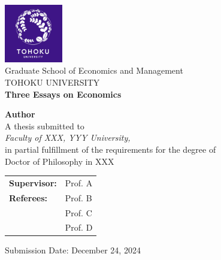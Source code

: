 \documentclass[oneside, 12pt, a4paper]{book}
\author{author}
\theoremstyle{definition}\newtheorem{definition}{Definition}
\theoremstyle{theorem}\newtheorem{corollary}{Corollary}
\theoremstyle{definition}\newtheorem{ass}{Assumption}
\theoremstyle{definition}\newtheorem{remark}{Remark}
\theoremstyle{theorem}\newtheorem{prop}{Proposition}
\theoremstyle{theorem}\newtheorem{lemma}{Lemma}
\theoremstyle{definition}\newtheorem{fact}{Fact}
\numberwithin{corollary}{chapter}
\numberwithin{prop}{chapter}
\numberwithin{ass}{chapter}
\numberwithin{definition}{chapter}
\numberwithin{lemma}{chapter}
\numberwithin{equation}{chapter}
\begin{document}

\begin{titlepage}
    \begin{center}
        \includegraphics[width=0.19\textwidth]{logo.png}\\[5pt]
        {Graduate School of Economics and Management}\\[5pt]
        {TOHOKU UNIVERSITY}\\[5pt]
        
        \vspace{1.5cm}
        {\huge\bfseries Three Essays on Economics}
        
        \vspace{1.5cm}
        {\Large\bfseries Author}\\[5pt]
        
        \vspace{2cm}
        {A thesis  submitted to} \\[5pt]
        \emph{{Faculty of XXX, YYY University,}}\\[5pt]
        {in partial fulfillment of the requirements for the degree of } \\[5pt]
        {Doctor of Philosophy in XXX} \\[5pt]
        \vfill
        
        \begin{tabular}{l l} 
            \textbf{Supervisor:}  & Prof. A \\ 
            \textbf{Referees:}    & Prof. B \\
                                  & Prof. C \\
                                  & Prof. D
        \end{tabular} 
        
        \vfill
        Submission Date: December 24, 2024
    \end{center}
\end{titlepage}
\end{document}
